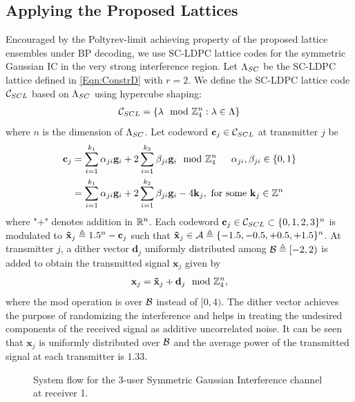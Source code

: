 \subsection{Applying the Proposed Lattices}
Encouraged by the Poltyrev-limit achieving property of the proposed lattice ensembles under BP decoding, we use SC-LDPC lattice codes for the symmetric Gaussian IC in the very strong interference region. Let $\Lambda_{SC}$ be the SC-LDPC lattice defined in \eqref{Eqn:ConstrD} with $r=2$.
We define the SC-LDPC lattice code $\mathcal{C}_{SCL}$ based on $\Lambda_{SC}$ using hypercube shaping:
\begin{align}
\mathcal{C}_{SCL}=\left\lbrace \mathbf{\lambda} \mod {\mathbb{Z}}_{4}^{n}: \mathbf{\lambda} \in \Lambda \right\rbrace
\end{align}
where $n$ is the dimension of $\Lambda_{SC}$. Let codeword $\mathbf{c}_{j}\in\mathcal{C}_{SCL}$ at transmitter $j$ be
\begin{align}
\mathbf{c}_{j}&= \sum_{i=1}^{k_{1}}\alpha_{ji}\mathbf{g}_i+2\sum_{i=1}^{k_{2}}\beta_{ji}\mathbf{g}_i \mod {\mathbb{Z}}_{4}^{n}\hspace{15pt} \alpha_{ji},\beta_{ji}\in \{0,1\}\\
\label{Eqn:SICCodeword}
&= \sum_{i=1}^{k_{1}}\alpha_{ji}\mathbf{g}_i+2\sum_{i=1}^{k_{2}}\beta_{ji}\mathbf{g}_i -4\mathbf{k}_{j}, \ \mbox{for some} \ \mathbf{k}_{j}\in\mathbb{Z}^{n}
\end{align}
where "$+$" denotes addition in $\mathbb{R}^{n}$. Each codeword $\mathbf{c}_{j}\in\mathcal{C}_{SCL}\subset\{0,1,2,3\}^{n}$ is modulated to $\mathbf{\tilde{x}}_{j}\triangleq 1.5^{n}-\mathbf{c}_{j}$ such that $\mathbf{\tilde{x}}_{j}\in\mathcal{A}\triangleq\{-1.5,-0.5,+0.5,+1.5\}^{n}$. At transmitter $j$, a dither vector $\mathbf{d}_{j}$ uniformly distributed among $\mathcal{B}\triangleq [-2,2)$ is added to obtain the transmitted signal $\mathbf{x}_j$ given by
\begin{align}
\mathbf{x}_{j}=\mathbf{\tilde{x}}_{j}+\mathbf{d}_{j} \mod {\mathbb{Z}}_{4}^{n},
\label{Eqn:SICdither}
\end{align}
where the mod operation is over $\mathcal{B}$ instead of $[0,4)$. The dither vector achieves the purpose of randomizing the interference and helps in treating the undesired components of the received signal as additive uncorrelated noise. It can be seen that $\mathbf{x}_{j}$ is uniformly distributed over $\mathcal{B}$ and the average power of the transmitted signal at each transmitter is $1.33$.

\begin{figure}[t]
\centering
\resizebox{0.8\textwidth}{!}{

}
\caption{System flow for the 3-user Symmetric Gaussian Interference channel at receiver 1.}
\label{Fig:SIC_decoder}
\end{figure}

